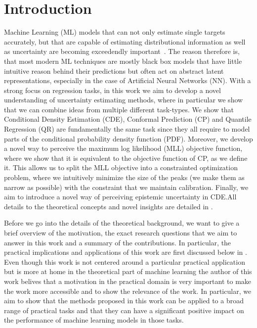 
\chapter{Introduction}\label{chap:introduction}

Machine Learning (ML) models that can not only estimate single targets accurately, but that are capable of estimating distributional information as well as uncertainty are becoming exceedendly important~\cite{hullermeier_aleatoric_2021, gawlikowski2023survey}. The reason therefore is, that most modern ML techniques are mostly black box models that have little intuitive reason behind their predictions but often act on abstract latent representations, especially in the case of Artificial Neural Networks (NN). With a strong focus on regression tasks, in this work we aim to develop a novel understanding of uncertainty estimating methods, where in particular we show that we can combine ideas from multiple different task-types. We show that Conditional Density Estimation (CDE), Conformal Prediction (CP) and Quantile Regression (QR) are fundamentally the same task since they all require to model parts of the conditional probability density function (PDF). Moreover, we develop a novel way to perceive the maximum log likelihood (MLL) objective function, where we show that it is equivalent to the objective function of CP, as we define it. This allows us to split the MLL objective into a constrainted optimization problem, where we intuitively minimize the size of the peaks (we make them as narrow as possible) with the constraint that we maintain calibration. Finally, we aim to introduce a novel way of perceiving epistemic uncertainty in CDE.\@ All details to the theoretical concepts and novel insights are detailed in .

Before we go into the details of the theoretical background, we want to give a brief overview of the motivation, the exact research questions that we aim to answer in this work and a summary of the contributions. In particular, the practical implications and applications of this work are first discussed below in . Even though this work is not centered around a particular practical application but is more at home in the theoretical part of machine learning the author of this work belives that a motivation in the practical domain is very important to make the work more accessible and to show the relevance of the work. In particular, we aim to show that the methods proposed in this work can be applied to a broad range of practical tasks and that they can have a significant positive impact on the performance of machine learning models in those tasks.

